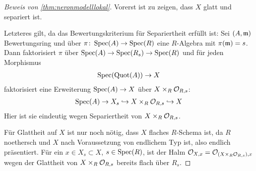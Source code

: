 
\begin{proof}[Beweis von \ref{thm:neronmodelllokal}]
  Vorerst ist zu zeigen, dass $X$ glatt und separiert ist.

  Letzteres gilt, da das Bewertungskriterium für Separiertheit
  erfüllt ist: Sei $(A,\mathfrak{m})$ Bewertungsring und über
  ${\pi\colon\operatorname{Spec}(A)\to\operatorname{Spec}(R)}$ eine $R$-Algebra mit ${\pi(\mathfrak{m})=s}$.
  Dann faktorisiert $\pi$ über
  ${\operatorname{Spec}(A)\to\operatorname{Spec}(R_s)\to\operatorname{Spec}(R)}$ und für jeden Morphismus
  \begin{gather*}
    \operatorname{Spec}(\operatorname{Quot}(A))\to X
  \end{gather*}
  faktorisiert eine Erweiterung ${\operatorname{Spec}(A)\to X}$ über
  ${X\times_R\mathcal{O}_{R,s}}$:
  \begin{gather*}
    \operatorname{Spec}(A)\to X_s\hookrightarrow X\times_R\mathcal{O}_{R,s}\hookrightarrow X
  \end{gather*}
  Hier ist sie eindeutig wegen
  Separiertheit von ${X\times_R\mathcal{O}_{R,s}}$.

  Für Glattheit auf $X$ ist nur noch nötig, dass $X$ flaches
  $R$-Schema ist, da $R$ noethersch und $X$ nach Voraussetzung von
  endlichem Typ ist, also endlich präsentiert.
  Für ein ${x\in X_s\subset X}$, ${s\in\operatorname{Spec}(R)}$, ist der Halm
  ${\mathcal{O}_{X,x}=\mathcal{O}_{(X\times_R\mathcal{O}_{R,s}),x}}$ wegen der Glattheit von
  ${X\times_R\mathcal{O}_{R,s}}$ bereits flach über $R_s$.


\end{proof}
